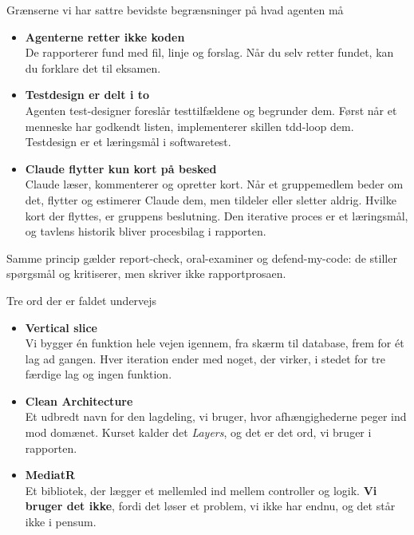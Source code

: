 \documentclass[aspectratio=169,10pt]{beamer}
\newcommand{\bottomnote}[1]{\vfill{\scriptsize\color{soft}#1}\vspace{1.5mm}}
\newcommand{\punkt}[2]{%
  \item[\textcolor{signal}{\rule{1.2pt}{4mm}}]
  {\large\bfseries\color{deep}#1}\\[1mm]{\small\color{soft}#2}}
\begin{document}
\begin{frame}{Grænserne vi har sat}{tre bevidste begrænsninger på hvad agenten må}
  \vspace{1mm}
  \begin{itemize}\setlength\itemsep{4mm}
    \punkt{Agenterne retter ikke koden}{De rapporterer fund med fil, linje og forslag. Når du selv retter fundet, kan du forklare det til eksamen.}
    \punkt{Testdesign er delt i to}{Agenten test-designer foreslår testtilfældene og begrunder dem. Først når et menneske har godkendt listen, implementerer skillen tdd-loop dem. Testdesign er et læringsmål i softwaretest.}
    \punkt{Claude flytter kun kort på besked}{Claude læser, kommenterer og opretter kort. Når et gruppemedlem beder om det, flytter og estimerer Claude dem, men tildeler eller sletter aldrig. Hvilke kort der flyttes, er gruppens beslutning. Den iterative proces er et læringsmål, og tavlens historik bliver procesbilag i rapporten.}
  \end{itemize}
  \bottomnote{Samme princip gælder report-check, oral-examiner og defend-my-code: de stiller spørgsmål og kritiserer, men skriver ikke rapportprosaen.}
\end{frame}

\begin{frame}{Tre ord der er faldet undervejs}{}
  \vspace{3mm}
  \begin{itemize}\setlength\itemsep{5mm}
    \punkt{Vertical slice}{Vi bygger én funktion hele vejen igennem, fra skærm til database, frem for ét lag ad gangen. Hver iteration ender med noget, der virker, i stedet for tre færdige lag og ingen funktion.}
    \punkt{Clean Architecture}{Et udbredt navn for den lagdeling, vi bruger, hvor afhængighederne peger ind mod domænet. Kurset kalder det \emph{Layers}, og det er det ord, vi bruger i rapporten.}
    \punkt{MediatR}{Et bibliotek, der lægger et mellemled ind mellem controller og logik. \textbf{Vi bruger det ikke}, fordi det løser et problem, vi ikke har endnu, og det står ikke i pensum.}
  \end{itemize}
\end{frame}
\end{document}
